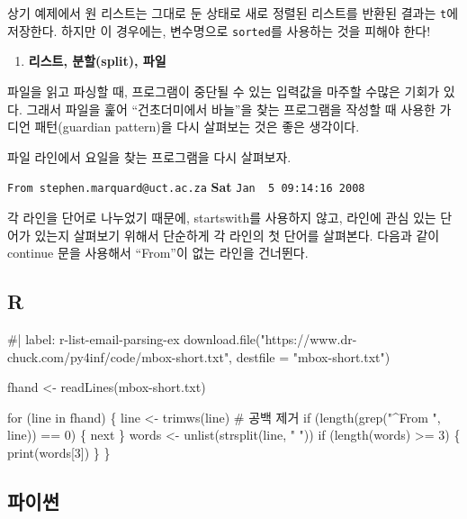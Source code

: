 \documentclass[
  letterpaper,
]{book}
\newenvironment{Shaded}{\begin{snugshade}}{\end{snugshade}}
\newcommand{\NormalTok}[1]{\textcolor[rgb]{0.00,0.23,0.31}{#1}}
\providecommand{\tightlist}{%
  \setlength{\itemsep}{0pt}\setlength{\parskip}{0pt}}\usepackage{longtable,booktabs,array}
\begin{document}
상기 예제에서 원 리스트는 그대로 둔 상태로 새로 정렬된 리스트를 반환된
결과는 \texttt{t}에 저장한다. 하지만 이 경우에는, 변수명으로
\texttt{sorted}를 사용하는 것을 피해야 한다!

\begin{enumerate}
\def\labelenumi{\arabic{enumi}.}
\setcounter{enumi}{2}
\tightlist
\item
  \textbf{리스트, 분할(split), 파일}
\end{enumerate}

파일을 읽고 파싱할 때, 프로그램이 중단될 수 있는 입력값을 마주할 수많은
기회가 있다. 그래서 파일을 훑어 ``건초더미에서 바늘''을 찾는 프로그램을
작성할 때 사용한 가디언 패턴(guardian pattern)을 다시 살펴보는 것은 좋은
생각이다.

파일 라인에서 요일을 찾는 프로그램을 다시 살펴보자.

\texttt{From\ stephen.marquard@uct.ac.za} \textbf{Sat}
\texttt{Jan\ \ 5\ 09:14:16\ 2008}

각 라인을 단어로 나누었기 때문에, startswith를 사용하지 않고, 라인에
관심 있는 단어가 있는지 살펴보기 위해서 단순하게 각 라인의 첫 단어를
살펴본다. 다음과 같이 continue 문을 사용해서 ``From''이 없는 라인을
건너뛴다.

\subsection{R}

\begin{Shaded}
\begin{Highlighting}[]
\NormalTok{\#| label: r{-}list{-}email{-}parsing{-}ex}
\NormalTok{download.file("https://www.dr{-}chuck.com/py4inf/code/mbox{-}short.txt",}
\NormalTok{              destfile = "mbox{-}short.txt")}

\NormalTok{fhand \textless{}{-} readLines(\textquotesingle{}mbox{-}short.txt\textquotesingle{})}

\NormalTok{for (line in fhand) \{}
\NormalTok{    line \textless{}{-} trimws(line)  \# 공백 제거}
\NormalTok{    if (length(grep("\^{}From ", line)) == 0) \{}
\NormalTok{        next}
\NormalTok{    \}}
\NormalTok{    words \textless{}{-} unlist(strsplit(line, " "))}
\NormalTok{    if (length(words) \textgreater{}= 3) \{}
\NormalTok{        print(words[3])}
\NormalTok{    \}}
\NormalTok{\}}
\end{Highlighting}
\end{Shaded}

\subsection{파이썬}
\end{document}
